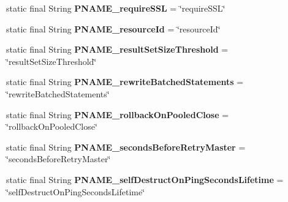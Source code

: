 \begin{DoxyCompactItemize}
\item 
\mbox{\label{classcom_1_1mysql_1_1cj_1_1conf_1_1_property_definitions_a944dbc4264f792eae85bad907abd0391}} 
static final String {\bfseries P\+N\+A\+M\+E\+\_\+require\+S\+SL} = \char`\"{}require\+S\+SL\char`\"{}
\item 
\mbox{\label{classcom_1_1mysql_1_1cj_1_1conf_1_1_property_definitions_a6db83fe49d225de9f03923cb5979d12b}} 
static final String {\bfseries P\+N\+A\+M\+E\+\_\+resource\+Id} = \char`\"{}resource\+Id\char`\"{}
\item 
\mbox{\label{classcom_1_1mysql_1_1cj_1_1conf_1_1_property_definitions_afd6c1c80b2ff8c652b66d8996dd8b389}} 
static final String {\bfseries P\+N\+A\+M\+E\+\_\+result\+Set\+Size\+Threshold} = \char`\"{}result\+Set\+Size\+Threshold\char`\"{}
\item 
\mbox{\label{classcom_1_1mysql_1_1cj_1_1conf_1_1_property_definitions_ab147a707fcf16a9bc6f0b2703e4c6796}} 
static final String {\bfseries P\+N\+A\+M\+E\+\_\+rewrite\+Batched\+Statements} = \char`\"{}rewrite\+Batched\+Statements\char`\"{}
\item 
\mbox{\label{classcom_1_1mysql_1_1cj_1_1conf_1_1_property_definitions_a79f501381612dd32518160ae5afa3622}} 
static final String {\bfseries P\+N\+A\+M\+E\+\_\+rollback\+On\+Pooled\+Close} = \char`\"{}rollback\+On\+Pooled\+Close\char`\"{}
\item 
\mbox{\label{classcom_1_1mysql_1_1cj_1_1conf_1_1_property_definitions_aac73129ea13b089870b3c8bffeec1d4d}} 
static final String {\bfseries P\+N\+A\+M\+E\+\_\+seconds\+Before\+Retry\+Master} = \char`\"{}seconds\+Before\+Retry\+Master\char`\"{}
\item 
\mbox{\label{classcom_1_1mysql_1_1cj_1_1conf_1_1_property_definitions_aba2a0c7a030119f2fe3066dd30ecefd5}} 
static final String {\bfseries P\+N\+A\+M\+E\+\_\+self\+Destruct\+On\+Ping\+Seconds\+Lifetime} = \char`\"{}self\+Destruct\+On\+Ping\+Seconds\+Lifetime\char`\"{}

\end{DoxyCompactItemize}
